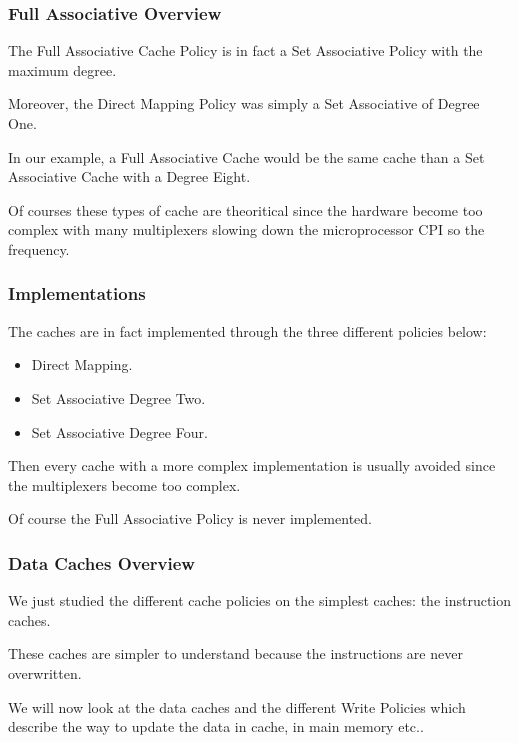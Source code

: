 
\begin{frame}
  \frametitle{Full Associative Overview}

  The Full Associative Cache Policy is in fact a Set Associative Policy
  with the maximum degree.

  \nl

  Moreover, the Direct Mapping Policy was simply a Set Associative of
  Degree One.

  \nl

  In our example, a Full Associative Cache would be the same cache than a
  Set Associative Cache with a Degree Eight.

  \nl

  Of courses these types of cache are theoritical since the
  hardware become too complex with many multiplexers slowing down
  the microprocessor CPI so the frequency.
\end{frame}


\begin{frame}
  \frametitle{Implementations}

  The caches are in fact implemented through the three different policies
  below:

  \begin{itemize}[<+->]
    \item
      Direct Mapping.
    \item
      Set Associative Degree Two.
    \item
      Set Associative Degree Four.
  \end{itemize}

  Then every cache with a more complex implementation is usually avoided
  since the multiplexers become too complex.

  \nl

  Of course the Full Associative Policy is never implemented.
\end{frame}


\begin{frame}
  \frametitle{Data Caches Overview}

  We just studied the different cache policies on the simplest caches:
  the instruction caches.

  \nl

  These caches are simpler to understand because the instructions are
  never overwritten.

  \nl

  We will now look at the data caches and the different Write Policies
  which describe the way to update the data in cache, in main memory etc..
\end{frame}

